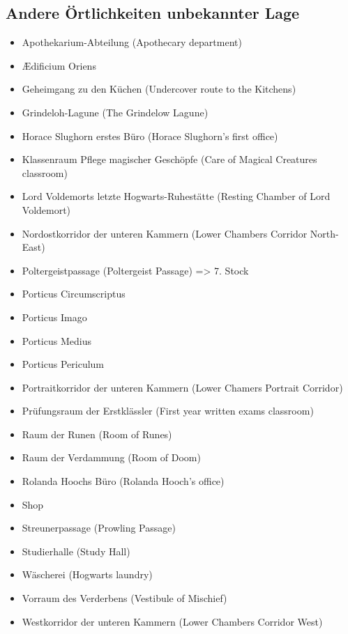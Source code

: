 \documentclass[a4paper, 10pt]{article}
\begin{document}
\subsection*{\large Andere Örtlichkeiten unbekannter Lage}
\vspace{10pt}
\begin{itemize}
    \item Apothekarium-Abteilung (Apothecary department)
    \item Ædificium Oriens
    \item Geheimgang zu den Küchen (Undercover route to the Kitchens)
    \item Grindeloh-Lagune (The Grindelow Lagune)
    \item Horace Slughorn erstes Büro (Horace Slughorn's first office)
    \item Klassenraum Pflege magischer Geschöpfe (Care of Magical Creatures classroom)
    \item Lord Voldemorts letzte Hogwarts-Ruhestätte (Resting Chamber of Lord Voldemort)
    \item Nordostkorridor der unteren Kammern (Lower Chambers Corridor North-East)
    \item Poltergeistpassage (Poltergeist Passage) => 7. Stock
    \item Porticus Circumscriptus
    \item Porticus Imago
    \item Porticus Medius
    \item Porticus Periculum
    \item Portraitkorridor der unteren Kammern (Lower Chamers Portrait Corridor)
    \item Prüfungsraum der Erstklässler (First year written exams classroom)
    \item Raum der Runen (Room of Runes)
    \item Raum der Verdammung (Room of Doom)
    \item Rolanda Hoochs Büro (Rolanda Hooch's office)
    \item Shop
    \item Streunerpassage (Prowling Passage)
    \item Studierhalle (Study Hall)
    \item Wäscherei (Hogwarts laundry)
    \item Vorraum des Verderbens (Vestibule of Mischief)
    \item Westkorridor der unteren Kammern (Lower Chambers Corridor West)
\end{itemize}
\end{document}
